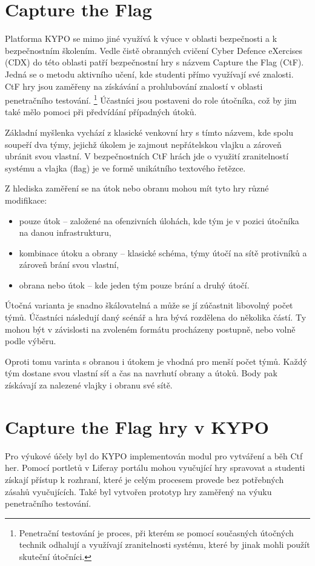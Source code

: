\documentclass[
  digital, %
  oneside, %
  table,   %
  nolof,     %
  nolot,     %
]{fithesis3}
\begin{document}
\section{Capture the Flag}
Platforma KYPO se mimo jiné využívá k výuce v oblasti bezpečnosti a k bezpečnostním školením. Vedle čistě obranných cvičení Cyber Defence eXercises (CDX) do této oblasti patří bezpečnostní hry s názvem Capture the Flag (CtF). \cite{ctfDesign} Jedná se o metodu aktivního učení, kde studenti přímo využívají své znalosti. CtF hry jsou zaměřeny na získávání a prohlubování znalostí v oblasti penetračního testování. \footnote{Penetrační testování je proces, při kterém se pomocí současných útočných technik odhalují a využívají zranitelnosti systému, které by jinak mohli použít skuteční útočníci.} Účastníci jsou postaveni do role útočníka, což by jim také mělo pomoci při předvídání případných útoků. \cite{lessons2015, ctfDesign}\par
Základní myšlenka vychází z klasické venkovní hry s tímto názvem, kde spolu soupeří dva týmy, jejichž úkolem je zajmout nepřátelskou vlajku a zároveň ubránit svou vlastní. V bezpečnostních CtF hrách jde o využití zranitelností systému a vlajka (flag) je ve formě unikátního textového řetězce.\par
Z hlediska zaměření se na útok nebo obranu mohou mít tyto hry různé modifikace: \cite{Dankovcikova2015thesis, ctfDesign}
\begin{itemize}
  \item pouze útok – založené na ofenzivních úlohách, kde tým je v pozici útočníka na danou infrastrukturu,
  \item kombinace útoku a obrany – klasické schéma, týmy útočí na sítě protivníků a zároveň brání svou vlastní,
  \item obrana nebo útok – kde jeden tým pouze brání a druhý útočí.
\end{itemize}
Útočná varianta je snadno škálovatelná a může se jí zúčastnit libovolný počet týmů. Účastníci následují daný scénář a hra bývá rozdělena do několika částí. Ty mohou být v závislosti na zvoleném formátu procházeny postupně, nebo volně podle výběru.\par
Oproti tomu varinta s obranou i útokem je vhodná pro menší počet týmů. Každý tým dostane svou vlastní síť a čas na navrhutí obrany a útoků. Body pak získávají za nalezené vlajky i obranu své sítě.\cite{Masarik2017thesis}

\section{Capture the Flag hry v KYPO}
Pro výukové účely byl do KYPO implementován modul pro vytváření a běh Ctf her. Pomocí portletů v Liferay portálu mohou vyučující hry spravovat a studenti získají přístup k rozhraní, které je celým procesem provede bez potřebných zásahů vyučujících. Také byl vytvořen prototyp hry zaměřený na výuku penetračního testování.
\end{document}
